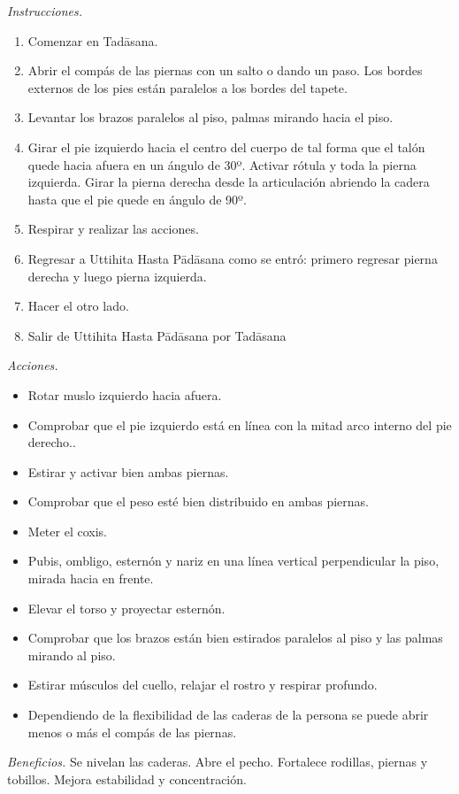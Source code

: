 \emph{Instrucciones.}
\begin{enumerate}
\item Comenzar en Tadāsana.
\item Abrir el compás de las piernas con un
salto o dando un paso. Los bordes externos de
los pies están paralelos a los bordes del
tapete.
\item Levantar los brazos paralelos al piso,
palmas mirando hacia el piso.
\item Girar el pie izquierdo hacia el centro
del cuerpo de tal forma que el talón quede
hacia afuera en un ángulo de 30º. Activar
rótula y toda la pierna izquierda. Girar la
pierna derecha desde la articulación abriendo
la cadera hasta que el pie quede en ángulo de
90º.
\item Respirar y realizar las acciones.
\item Regresar a Uttihita Hasta Pādāsana como
se entró: primero regresar pierna derecha y
luego pierna izquierda.
\item Hacer el otro lado.
\item Salir de Uttihita Hasta Pādāsana por
Tadāsana
\end{enumerate}

\emph{Acciones.}
\begin{itemize}
\item Rotar muslo izquierdo hacia afuera.
\item Comprobar que el pie izquierdo está en
línea con la mitad arco interno del pie
derecho..
\item Estirar y activar bien ambas piernas.
\item Comprobar que el peso esté bien
distribuido en ambas piernas.
\item Meter el coxis.
\item Pubis, ombligo, esternón y nariz en una
línea vertical perpendicular la piso, mirada
hacia en frente.
\item Elevar el torso y proyectar esternón.
\item Comprobar que los brazos están bien
estirados paralelos al piso y las palmas
mirando al piso.
\item Estirar músculos del cuello, relajar el
rostro y respirar profundo.
\item Dependiendo de la flexibilidad de las
caderas de la persona se puede abrir menos o
más el compás de las piernas.
\end{itemize}

\emph{Beneficios.} Se nivelan las caderas.
Abre el pecho. Fortalece rodillas, piernas y
tobillos. Mejora estabilidad y concentración.

